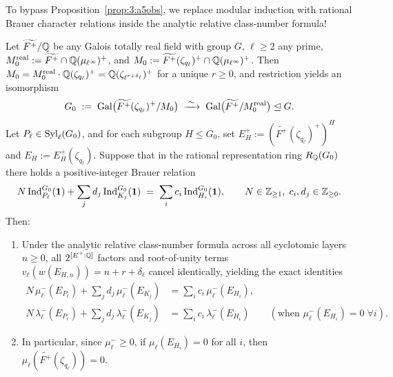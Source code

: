 To bypass Proposition~\ref{prop:3:a5obs}, we replace modular induction with rational Brauer character relations inside the analytic relative class-number formula!

\begin{theorem}\label{thm:3:descent}
\tagProved{}
Let $\widetilde{F^+}/\mathbb{Q}$ be any Galois totally real field with group $G$, $\ell \ge 2$ any prime, $M_0^{\mathrm{real}} := \widetilde{F^+} \cap \mathbb{Q}(\mu_{\ell^\infty})^+$, and $M_0 := \widetilde{F^+}(\zeta_{q_\ell})^+ \cap \mathbb{Q}(\mu_{\ell^\infty})^+$. Then $M_0 = M_0^{\mathrm{real}} \cdot \mathbb{Q}(\zeta_{q_\ell})^+ = \mathbb{Q}(\zeta_{\ell^{r+\delta_\ell}})^+$ for a unique $r \ge 0$, and restriction yields an isomorphism
\[
  G_0 \;:=\; \mathrm{Gal}\bigl(\widetilde{F^+}(\zeta_{q_\ell})^+ / M_0\bigr) \;\xrightarrow{\;\sim\;}\; \mathrm{Gal}\bigl(\widetilde{F^+} / M_0^{\mathrm{real}}\bigr) \trianglelefteq G.
\]
Let $P_\ell \in \mathrm{Syl}_\ell(G_0)$, and for each subgroup $H \le G_0$, set $E_H^+ := (\widetilde{F^+}(\zeta_{q_\ell})^+)^H$ and $E_H := E_H^+(\zeta_{q_\ell})$. Suppose that in the rational representation ring $R_{\mathbb{Q}}(G_0)$ there holds a positive-integer Brauer relation
\begin{equation}\label{eq:3:brauer-rel}
  N\,\mathrm{Ind}_{P_\ell}^{G_0}(\mathbf{1}) + \sum_j d_j\,\mathrm{Ind}_{K_j}^{G_0}(\mathbf{1}) \;=\; \sum_i c_i\,\mathrm{Ind}_{H_i}^{G_0}(\mathbf{1}), \qquad N \in \mathbb{Z}_{\ge 1},\; c_i, d_j \in \mathbb{Z}_{\ge 0}.
\end{equation}
Then:
\begin{enumerate}[label=\textup{(\roman*)}]
\item Under the analytic relative class-number formula across all cyclotomic layers $n \ge 0$, all $2^{[E^+:\mathbb{Q}]}$ factors and root-of-unity terms $v_\ell(w(E_{H,n})) = n + r + \delta_\ell$ cancel identically, yielding the exact identities
\begin{align}
  N\,\mu_\ell^-(E_{P_\ell}) + \sum_j d_j\,\mu_\ell^-(E_{K_j}) &= \sum_i c_i\,\mu_\ell^-(E_{H_i}), \label{eq:3:mu-id}\\
  N\,\lambda_\ell^-(E_{P_\ell}) + \sum_j d_j\,\lambda_\ell^-(E_{K_j}) &= \sum_i c_i\,\lambda_\ell^-(E_{H_i}) \qquad (\text{when } \mu_\ell^-(E_{H_i}) = 0 \;\forall i). \label{eq:3:lam-id}
\end{align}
\item In particular, since $\mu_\ell^- \ge 0$, if $\mu_\ell(E_{H_i}) = 0$ for all $i$, then $\mu_\ell(\widetilde{F^+}(\zeta_{q_\ell})) = 0$.
\end{enumerate}
\end{theorem}
